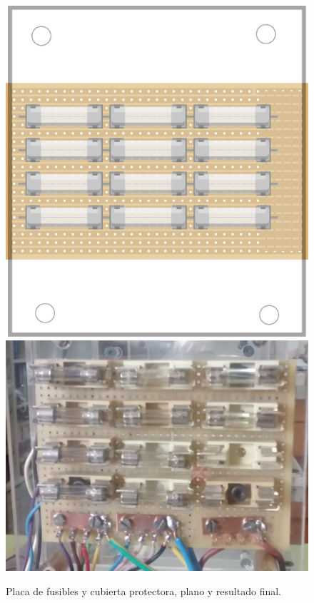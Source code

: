 \documentclass{article}
\begin{document}
\begin{figure}[H]
	\centering
	\includegraphics[height=0.25\textheight]{planos/fusibles}
	\includegraphics[height=0.25\textheight]{fotos/fusibles}
	\caption{Placa de fusibles y cubierta protectora, plano y resultado final.}
\end{figure}
\end{document}
